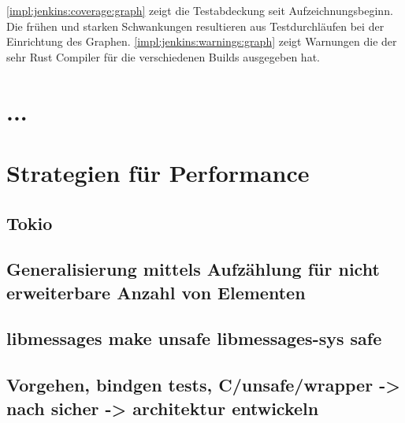 \autoref{impl:jenkins:coverage:graph} zeigt die Testabdeckung seit Aufzeichnungsbeginn.
Die frühen und starken Schwankungen resultieren aus Testdurchläufen bei der Einrichtung des Graphen.
\autoref{impl:jenkins:warnings:graph} zeigt Warnungen die der sehr  Rust Compiler für die verschiedenen Builds ausgegeben hat.

\section{...}




\section{Strategien für Performance}









\subsection{Tokio}

	\subsection{Generalisierung mittels Aufzählung für nicht erweiterbare Anzahl von Elementen}
	
	\subsection{libmessages make unsafe libmessages-sys safe}
	
	\subsection{Vorgehen, bindgen tests, C/unsafe/wrapper -> nach sicher ->  architektur entwickeln}
	

